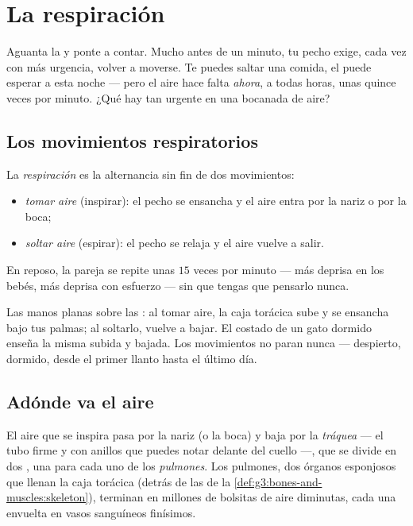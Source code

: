 \chapter{La respiración}\label{ch:g4:breathing}

Aguanta la  y ponte a contar. Mucho antes de un minuto, tu
pecho exige, cada vez con más urgencia, volver a moverse. Te puedes
saltar una comida, el  puede esperar a esta noche --- pero el
aire hace falta \emph{ahora}, a todas horas, unas quince veces por
minuto. ¿Qué hay tan urgente en una bocanada de aire?

\section{Los movimientos respiratorios}

\begin{definition}\label{def:g4:breathing:movements}
La \emph{respiración} es la alternancia sin fin de
dos movimientos:
\begin{itemize}
  \item \emph{tomar aire} (inspirar): el pecho se
        ensancha y el aire entra por la nariz o por la boca;
  \item \emph{soltar aire} (espirar): el pecho se
        relaja y el aire vuelve a salir.
\end{itemize}
En reposo, la pareja se repite unas $15$ veces por minuto --- más
deprisa en los bebés, más deprisa con esfuerzo --- sin que tengas que
pensarlo nunca.
\end{definition}

\begin{example}\label{ex:g4:breathing:watch}
Las manos planas sobre las : al tomar aire, la caja torácica
sube y se ensancha bajo tus palmas; al soltarlo, vuelve a bajar. El
costado de un gato dormido enseña la misma subida y bajada. Los
movimientos no paran nunca --- despierto, dormido, desde el primer
llanto hasta el último día.
\end{example}

\section{Adónde va el aire}

\begin{definition}\label{def:g4:breathing:organs}
El aire que se inspira pasa por la nariz (o la boca) y baja por la
\emph{tráquea} --- el tubo firme y con anillos que
puedes notar delante del cuello ---, que se divide en dos , una
para cada uno de los \emph{pulmones}. Los pulmones, dos
órganos
esponjosos que llenan la caja torácica (detrás de las  de la
\cref{def:g3:bones-and-muscles:skeleton}), terminan en millones de
bolsitas de aire diminutas, cada una envuelta en vasos sanguíneos
finísimos.
\end{definition}

